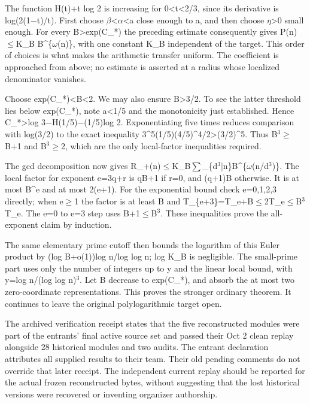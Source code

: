 \documentclass[11pt,a4paper]{article}
\begin{document}
The function H(t)+t log 2 is increasing for 0<t<2/3, since its derivative is log(2(1\ensuremath{-}t)/t). First choose \ensuremath{\beta}<\ensuremath{\alpha}<a close enough to a, and then choose \ensuremath{\eta}>0 small enough. For every B>exp(C\_*) the preceding estimate consequently gives P(n)\ensuremath{\leq}K\_B B\textasciicircum{}\{\ensuremath{\omega}(n)\}, with one constant K\_B independent of the target. This order of choices is what makes the arithmetic transfer uniform. The coefficient is approached from above; no estimate is asserted at a radius whose localized denominator vanishes.

Choose exp(C\_*)<B<2. We may also ensure B>3/2. To see the latter threshold lies below exp(C\_*), note a<1/5 and the monotonicity just established. Hence C\_*>log 3\ensuremath{-}H(1/5)\ensuremath{-}(1/5)log 2. Exponentiating five times reduces comparison with log(3/2) to the exact inequality 3\textasciicircum{}5(1/5)(4/5)\textasciicircum{}4/2>(3/2)\textasciicircum{}5. Thus B\ensuremath{^3}\ensuremath{\geq}B+1 and B\ensuremath{^3}\ensuremath{\geq}2, which are the only local-factor inequalities required.

The gcd decomposition now gives R\_+(n)\ensuremath{\leq}K\_B\ensuremath{\sum}\_\{d\ensuremath{^3}|n\}B\textasciicircum{}\{\ensuremath{\omega}(n/d\ensuremath{^3})\}. The local factor for exponent e=3q+r is qB+1 if r=0, and (q+1)B otherwise. It is at most B\textasciicircum{}e and at most 2(e+1). For the exponential bound check e=0,1,2,3 directly; when e\ensuremath{\geq}1 the factor is at least B and T\_\{e+3\}=T\_e+B\ensuremath{\leq}2T\_e\ensuremath{\leq}B\ensuremath{^3}T\_e. The e=0 to e=3 step uses B+1\ensuremath{\leq}B\ensuremath{^3}. These inequalities prove the all-exponent claim by induction.

The same elementary prime cutoff then bounds the logarithm of this Euler product by (log B+o(1))log n/log log n; log K\_B is negligible. The small-prime part uses only the number of integers up to y and the linear local bound, with y=log n/(log log n)\ensuremath{^3}. Let B decrease to exp(C\_*), and absorb the at most two zero-coordinate representations. This proves the stronger ordinary theorem. It continues to leave the original polylogarithmic target open.

The archived verification receipt states that the five reconstructed modules were part of the entrants' final active source set and passed their Oct 2 clean replay alongside 28 historical modules and two audits. The entrant declaration attributes all supplied results to their team. Their old pending comments do not override that later receipt. The independent current replay should be reported for the actual frozen reconstructed bytes, without suggesting that the lost historical versions were recovered or inventing organizer authorship.
\end{document}

